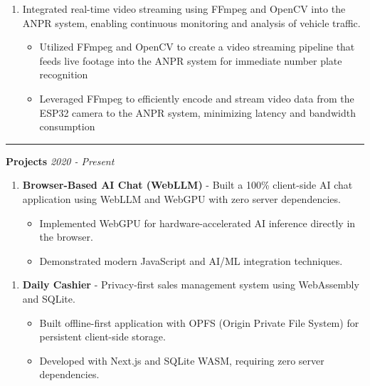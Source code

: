 \documentclass{article}
\begin{document}
\begin{enumerate}
    \item[] Integrated real-time video streaming using FFmpeg and OpenCV into the ANPR system, enabling continuous monitoring and analysis of vehicle traffic.
   \begin{itemize}
    \item Utilized FFmpeg and OpenCV to create a video streaming pipeline that feeds live footage into the ANPR system for immediate number plate recognition
    \item Leveraged FFmpeg to efficiently encode and stream video data from the ESP32 camera to the ANPR system, minimizing latency and bandwidth consumption
   \end{itemize}
\end{enumerate}






\vspace{6.9em}
\hrule 
\vspace{6.4em}
\hspace{-2.em}
{\bf Projects } \hfill {\em 2020 - Present } %


\begin{enumerate}
    \item \textbf{Browser-Based AI Chat (WebLLM)} - Built a 100\% client-side AI chat application using WebLLM and WebGPU with zero server dependencies.
   \begin{itemize}
    \item Implemented WebGPU for hardware-accelerated AI inference directly in the browser.
    \item Demonstrated modern JavaScript and AI/ML integration techniques.
   \end{itemize}
\end{enumerate}

\begin{enumerate}
    \item \textbf{Daily Cashier} - Privacy-first sales management system using WebAssembly and SQLite.
   \begin{itemize}
    \item Built offline-first application with OPFS (Origin Private File System) for persistent client-side storage.
    \item Developed with Next.js and SQLite WASM, requiring zero server dependencies.
   \end{itemize}
\end{enumerate}
\end{document}

